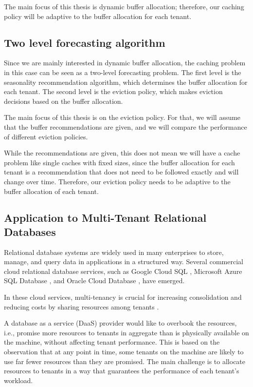 The main focus of this thesis is dynamic buffer allocation; therefore, our caching policy 
will be adaptive to the buffer allocation for each tenant.

\subsection{Two level forecasting algorithm}

Since we are mainly interested in dynamic buffer allocation, the caching problem in this case can 
be seen as a two-level forecasting problem. The first level is the seasonality recommendation 
algorithm, which determines the buffer allocation for each tenant. The second level is the 
eviction policy, which makes eviction decisions based on the buffer allocation.

The main focus of this thesis is on the eviction policy. For that, we will assume that the buffer 
recommendations are given, and we will compare the performance of different eviction policies.

While the recommendations are given, this does not mean we will have a cache problem like single 
caches with fixed sizes, since the buffer allocation for each tenant is a recommendation that does 
not need to be followed exactly and will change over time. Therefore, our eviction policy needs 
to be adaptive to the buffer allocation of each tenant.

\subsection{Application to Multi-Tenant Relational Databases}

Relational database systems are widely used in many enterprises to store, manage, and query data 
in applications in a structured way. Several commercial cloud relational database services, such 
as Google Cloud SQL \cite{google-cloud-sql}, Microsoft Azure SQL Database \cite{azure-sql}, and 
Oracle Cloud Database \cite{oracle-cloud}, have emerged.

In these cloud services, multi-tenancy is crucial for increasing consolidation and reducing 
costs by sharing resources among tenants \cite{buffer-sharing-1}.

A database as a service (DaaS) provider would like to overbook the resources, i.e., promise more 
resources to tenants in aggregate than is physically available on the machine, without affecting 
tenant performance. This is based on the observation that at any point in time, some tenants on 
the machine are likely to use far fewer resources than they are promised. \cite{buffer-sharing-1} 
The main challenge is to allocate resources to tenants in a way that guarantees the performance 
of each tenant's workload.

